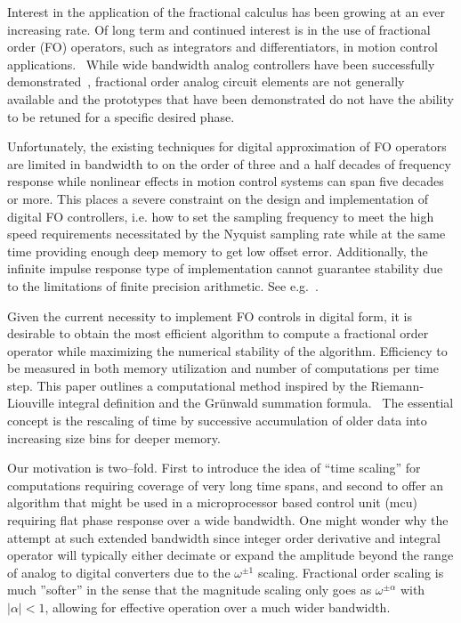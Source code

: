 
Interest in the application of the fractional calculus has been
growing at an ever increasing rate. Of long term and continued
interest is in the use of fractional order (FO) operators, such as
integrators and differentiators, in motion control
applications.~\cite{Luo:13} While wide bandwidth analog controllers
have been successfully demonstrated~\cite{Bohannan:08}, fractional
order analog circuit elements are not generally available and the
prototypes that have been demonstrated do not have the ability to be
retuned for a specific desired phase.~\cite{Monje:10}

Unfortunately, the existing techniques for digital approximation of FO
operators are limited in bandwidth to on the order of three and a half
decades of frequency response while nonlinear effects in motion
control systems can span five decades or more. This places a severe
constraint on the design and implementation of digital FO controllers,
i.e. how to set the sampling frequency to meet the high speed
requirements necessitated by the Nyquist sampling rate while at the
same time providing enough deep memory to get low offset
error. Additionally, the infinite impulse response type of
implementation cannot guarantee stability due to the limitations of
finite precision arithmetic. See e.g.~\cite{Chen:04a}.

Given the current necessity to implement FO controls in digital form,
it is desirable to obtain the most efficient algorithm to compute a
fractional order operator while maximizing the numerical stability of
the algorithm. Efficiency to be measured in both memory utilization
and number of computations per time step. This paper outlines a
computational method inspired by the Riemann-Liouville integral
definition and the Gr{\"u}nwald summation formula.~\cite{OldSpan:74} 
The essential concept is the rescaling of time by successive accumulation
of older data into increasing size bins for deeper memory.

Our motivation is two--fold. First to introduce the idea of ``time scaling'' 
for computations requiring coverage of very long time spans, and 
second to offer an algorithm that might be used in a microprocessor
based control unit (mcu) requiring flat phase response over a 
wide bandwidth. One might wonder why the attempt at such extended
bandwidth since integer order derivative and integral operator will typically
either decimate or expand the amplitude beyond the range of analog
to digital converters due to the $\omega^{\pm 1}$ scaling. 
Fractional order scaling is much ''softer'' in the sense that the magnitude
scaling only goes as $\omega^{\pm \alpha}$ with $|\alpha | < 1$, 
allowing for effective operation over a much wider bandwidth.
